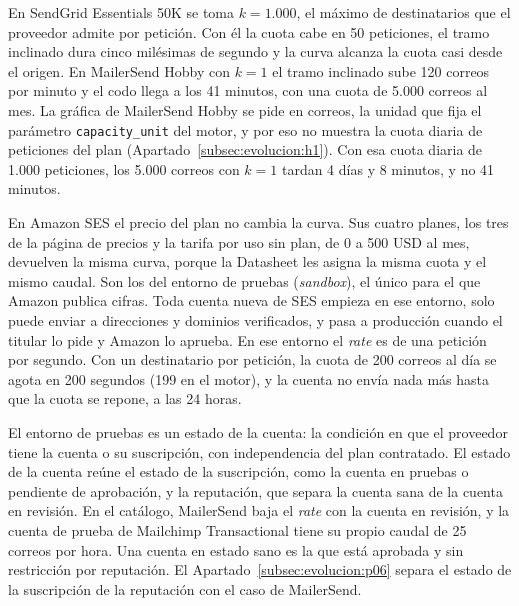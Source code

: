 En SendGrid Essentials 50K se toma $k = 1.000$, el máximo de destinatarios que el proveedor admite por petición.
Con él la cuota cabe en 50 peticiones, el tramo inclinado dura cinco milésimas de segundo y la curva alcanza la cuota casi desde el origen.
En MailerSend Hobby con $k = 1$ el tramo inclinado sube 120 correos por minuto y el codo llega a los 41 minutos, con una cuota de 5.000 correos al mes.
La gráfica de MailerSend Hobby se pide en correos, la unidad que fija el parámetro \texttt{capacity\_unit} del motor, y por eso no muestra la cuota diaria de peticiones del plan (Apartado~\ref{subsec:evolucion:h1}).
Con esa cuota diaria de 1.000 peticiones, los 5.000 correos con $k = 1$ tardan 4 días y 8 minutos, y no 41 minutos.

En Amazon SES el precio del plan no cambia la curva.
Sus cuatro planes, los tres de la página de precios y la tarifa por uso sin plan, de 0 a 500 USD al mes, devuelven la misma curva, porque la Datasheet les asigna la misma cuota y el mismo caudal.
Son los del entorno de pruebas (\textit{sandbox}), el único para el que Amazon publica cifras.
Toda cuenta nueva de SES empieza en ese entorno, solo puede enviar a direcciones y dominios verificados, y pasa a producción cuando el titular lo pide y Amazon lo aprueba.
En ese entorno el \textit{rate} es de una petición por segundo.
Con un destinatario por petición, la cuota de 200 correos al día se agota en 200 segundos (199 en el motor), y la cuenta no envía nada más hasta que la cuota se repone, a las 24 horas.

El entorno de pruebas es un estado de la cuenta: la condición en que el proveedor tiene la cuenta o su suscripción, con independencia del plan contratado.
El estado de la cuenta reúne el estado de la suscripción, como la cuenta en pruebas o pendiente de aprobación, y la reputación, que separa la cuenta sana de la cuenta en revisión.
En el catálogo, MailerSend baja el \textit{rate} con la cuenta en revisión, y la cuenta de prueba de Mailchimp Transactional tiene su propio caudal de 25 correos por hora.
Una cuenta en estado sano es la que está aprobada y sin restricción por reputación.
El Apartado~\ref{subsec:evolucion:p06} separa el estado de la suscripción de la reputación con el caso de MailerSend.
